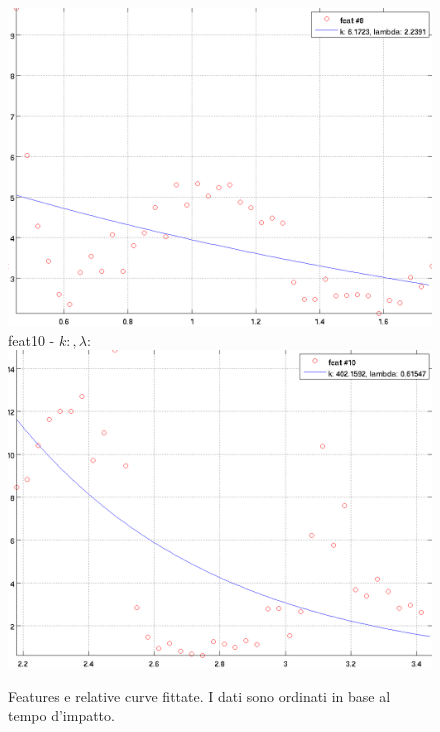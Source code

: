 \documentclass[12pt]{report}
\begin{document}
\begin{figure}[H]
\begin{minipage}[t]{0.5\linewidth}
	\includegraphics[scale=\imFeat]{images/feat8}\\
	feat10 - $k: , \lambda:  $\\
	\includegraphics[scale=\imFeat]{images/feat10}\\
\end{minipage}
\caption[short]{Features e relative curve fittate. I dati sono ordinati in base al tempo d'impatto.}
\label{fig:feats2}
\end{figure}
\end{document}
